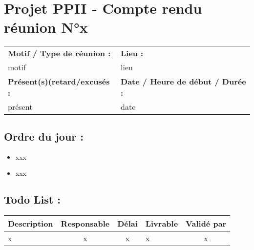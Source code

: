 \documentclass{article}
\begin{document}
\section*{Projet PPII - Compte rendu réunion N°x}
\begin{tabular}{|p{7cm}|p{6cm}|}
    \hline
    \textbf{Motif / Type de réunion :}
    & \textbf{Lieu :}
    \\
    motif 
    & 
    lieu
    \\ \hline
    \textbf{Présent(s)(retard/excusés :}
    &
    \textbf{Date / Heure de début / Durée :}
    \\ 
    présent
    &
    date
    \\ \hline
\end{tabular}

\subsection*{Ordre du jour :}
\begin{itemize}
    \item{xxx}
    \item{xxx}
\end{itemize}

\subsection*{Todo List :}
\begin{tabular}{|p{3.5cm}|c|c|p{4.5cm}|c|}
    \hline 
    Description & Responsable & Délai & Livrable & Validé par 
    \\ \hline
    x & x & x & x & x
    \\ \hline
\end{tabular}
\end{document}
